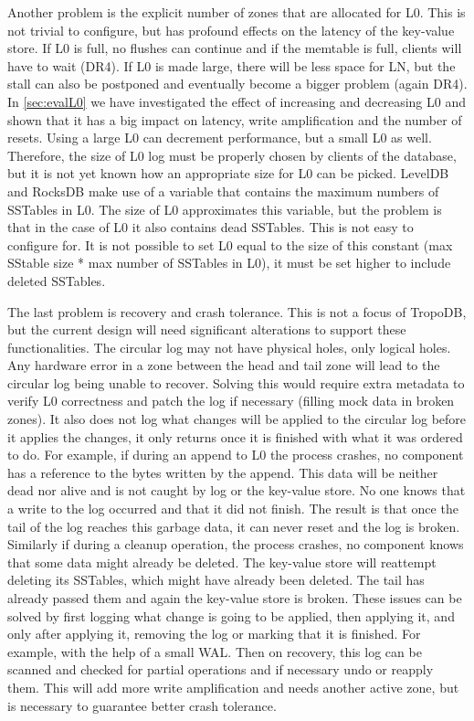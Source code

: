 Another problem is the explicit number of zones that are allocated for L0. This is not trivial to configure, but has profound effects on the latency of the key-value store. If L0 is full, no flushes can continue and if the memtable is full, clients will have to wait (DR4). If L0 is made large, there will be less space for LN, but the stall can also be postponed and eventually become a bigger problem (again DR4). In \autoref{sec:evalL0} we have investigated the effect of increasing and decreasing L0 and shown that it has a big impact on latency, write amplification and the number of resets. Using a large L0 can decrement performance, but a small L0 as well. Therefore, the size of L0 log must be properly chosen by clients of the database, but it is not yet known how an appropriate size for L0 can be picked.  LevelDB and RocksDB make use of a variable that contains the maximum numbers of SSTables in L0. The size of L0 approximates this variable, but the problem is that in the case of L0 it also contains dead SSTables. This is not easy to configure for. It is not possible to set L0 equal to the size of this constant (max SStable size * max number of SSTables in L0), it must be set higher to include deleted SSTables.

The last problem is recovery and crash tolerance. This is not a focus of TropoDB, but the current design will need significant alterations to support these functionalities. The circular log may not have physical holes, only logical holes. Any hardware error in a zone between the head and tail zone will lead to the circular log being unable to recover. Solving this would require extra metadata to verify L0 correctness and patch the log if necessary (filling mock data in broken zones). It also does not log what changes will be applied to the circular log before it applies the changes, it only returns once it is finished with what it was ordered to do. For example, if during an append to L0 the process crashes, no component has a reference to the bytes written by the append. This data will be neither dead nor alive and is not caught by log or the key-value store. No one knows that a write to the log occurred and that it did not finish. The result is that once the tail of the log reaches this garbage data, it can never reset and the log is broken. Similarly if during a cleanup operation, the process crashes, no component knows that some data might already be deleted. The key-value store will reattempt deleting its SSTables, which might have already been deleted. The tail has already passed them and again the key-value store is broken. These issues can be solved by first logging what change is going to be applied, then applying it, and only after applying it, removing the log or marking that it is finished. For example, with the help of a small WAL. Then on recovery, this log can be scanned and checked for partial operations and if necessary undo or reapply them. This will add more write amplification and needs another active zone, but is necessary to guarantee better crash tolerance.  

